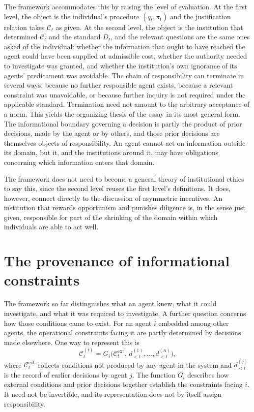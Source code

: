 \documentclass[11pt]{article}
\newcommand{\C}{\mathcal C}
\theoremstyle{definition}
\begin{document}
The framework accommodates this by raising the level of evaluation. At the first level, the object is the individual's procedure $(q_t,\pi_t)$ and the justification relation takes $\C_t$ as given. At the second level, the object is the institution that determined $\C_t$ and the standard $D_t$, and the relevant questions are the same ones asked of the individual: whether the information that ought to have reached the agent could have been supplied at admissible cost, whether the authority needed to investigate was granted, and whether the institution's own ignorance of its agents' predicament was avoidable. The chain of responsibility can terminate in several ways: because no further responsible agent exists, because a relevant constraint was unavoidable, or because further inquiry is not required under the applicable standard. Termination need not amount to the arbitrary acceptance of a norm. This yields the organizing thesis of the essay in its most general form. The informational boundary governing a decision is partly the product of prior decisions, made by the agent or by others, and those prior decisions are themselves objects of responsibility. An agent cannot act on information outside its domain, but it, and the institutions around it, may have obligations concerning which information enters that domain.

The framework does not need to become a general theory of institutional ethics to say this, since the second level reuses the first level's definitions. It does, however, connect directly to the discussion of asymmetric incentives. An institution that rewards opportunism and punishes diligence is, in the sense just given, responsible for part of the shrinking of the domain within which individuals are able to act well.

\section{The provenance of informational constraints}

The framework so far distinguishes what an agent knew, what it could investigate, and what it was required to investigate. A further question concerns how those conditions came to exist. For an agent $i$ embedded among other agents, the operational constraints facing it are partly determined by decisions made elsewhere. One way to represent this is
\[
\C_t^{(i)}
=
G_i\bigl(
\C_t^{\mathrm{ext}},\,
d_{<t}^{(1)},\ldots,d_{<t}^{(n)}
\bigr),
\]
where $\C_t^{\mathrm{ext}}$ collects conditions not produced by any agent in the system and $d_{<t}^{(j)}$ is the record of earlier decisions by agent $j$. The function $G_i$ describes how external conditions and prior decisions together establish the constraints facing $i$. It need not be invertible, and its representation does not by itself assign responsibility.
\end{document}
